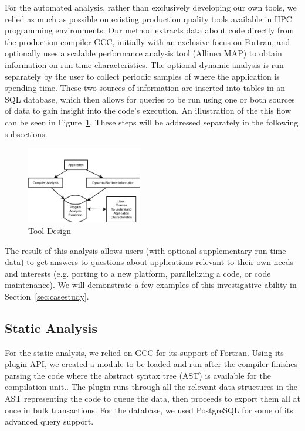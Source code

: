 For the automated analysis, rather than exclusively developing our own tools, we relied as much as 
possible on existing production quality tools available in HPC programming environments.
Our method extracts data about code directly from the production compiler \acs{GCC}, initially with 
an exclusive focus on Fortran, and optionally uses a scalable performance analysis tool (Allinea 
MAP) to obtain information on run-time characteristics.
The optional dynamic analysis is run separately by the user to collect periodic samples of where the 
application is spending time.
These two sources of information are inserted into tables in an \acs{SQL} database, which then 
allows 
for queries to be run using one or both sources of data to gain insight into the code's execution.
An illustration of the this flow can be seen in Figure~\ref{fig:design}.
These steps will be addressed separately in the following subsections.

\begin{figure}
\begin{center}
\includegraphics[width=0.45\textwidth]{images/design.png}
\end{center}
\caption{Tool Design}
\label{fig:design}
\end{figure}

The result of this analysis allows users (with optional supplementary run-time data) to get answers to 
questions about applications relevant to their own needs and interests (e.g. porting to a new platform, parallelizing a code, or code maintenance).
We will demonstrate a few examples of this investigative ability in Section~\ref{sec:casestudy}.

\subsection{Static Analysis}
For the static analysis, we relied on \acs{GCC} for its support of Fortran.
Using its plugin \acs{API}, we created a module to be loaded and run after the compiler finishes 
parsing the code where the abstract syntax tree (AST) is available for the compilation unit..
The plugin runs through all the relevant data structures in the \ac{AST} representing the code to 
queue the data, then proceeds to export them all at once in bulk transactions.
For the database, we used PostgreSQL for some of its advanced query support.
